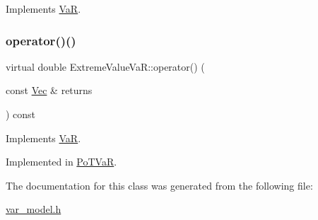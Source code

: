 Implements \hyperlink{classVaR_a31cb62626488715a9133679feaba31e5}{VaR}.

\hypertarget{classExtremeValueVaR_a3be021ee0faa2285bcb6be19815e3dc7}{}\label{classExtremeValueVaR_a3be021ee0faa2285bcb6be19815e3dc7} 
\subsubsection{\texorpdfstring{operator()()}{operator()()}\hspace{0.1cm}{\footnotesize\ttfamily [3/3]}}
{\footnotesize\ttfamily virtual double Extreme\+Value\+Va\+R\+::operator() (\begin{DoxyParamCaption}\item[{const \hyperlink{compute__returns__eigen_8h_a1eb6a9306ef406d7975f3cbf2e247777}{Vec} \&}]{returns }\end{DoxyParamCaption}) const\hspace{0.3cm}{\ttfamily [pure virtual]}}



Implements \hyperlink{classVaR_a1bd868d9953bfaeb49f5bf7d16986631}{VaR}.



Implemented in \hyperlink{classPoTVaR_a3360bbbeceae9bbd0c721e48586bf38c}{Po\+T\+VaR}.



The documentation for this class was generated from the following file\+:\begin{DoxyCompactItemize}
\item 
\hyperlink{var__model_8h}{var\+\_\+model.\+h}\end{DoxyCompactItemize}
